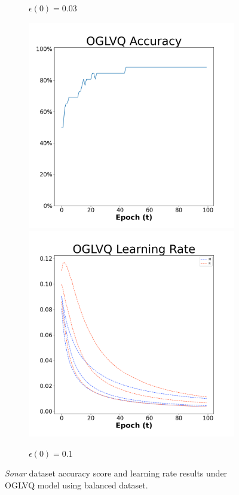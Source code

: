 \begin{figure}[H]
\begin{subfigure}{0.3\textwidth}
  \caption{$\epsilon(0)=0.03$}
\end{subfigure}\hfil %
\begin{subfigure}{0.3\textwidth}
  \includegraphics[width=\linewidth]{images/exper1/Sonar/OGLVQ_0.1_acc.png}
  \includegraphics[width=\linewidth]{images/exper1/Sonar/OGLVQ_0.1_lr.png}
  \caption{$\epsilon(0)=0.1$}
\end{subfigure}

\caption{\textit{Sonar} dataset accuracy score and learning rate results under OGLVQ model using balanced dataset.}
\end{figure}



